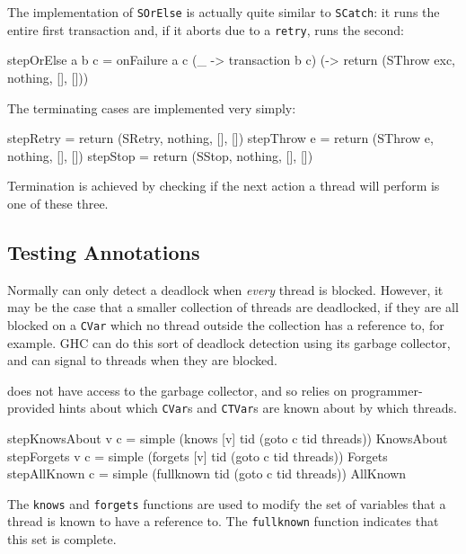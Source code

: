 The implementation of \verb|SOrElse| is actually quite similar to
\verb|SCatch|: it runs the entire first transaction and, if it aborts
due to a \verb|retry|, runs the second:

\begin{haskellcode}
stepOrElse a b c = onFailure a c
  (\_   -> transaction b c)
  (\exc -> return (SThrow exc, nothing, [], []))
\end{haskellcode}

The terminating cases are implemented very simply:

\begin{haskellcode}
stepRetry   = return (SRetry,   nothing, [], [])
stepThrow e = return (SThrow e, nothing, [], [])
stepStop    = return (SStop,    nothing, [], [])
\end{haskellcode}

Termination is achieved by checking if the next action a thread will
perform is one of these three.

\subsection{Testing Annotations}
\label{sec:execution-stepwise-annotations}


Normally \dejafu{} can only detect a deadlock when \emph{every} thread
is blocked. However, it may be the case that a smaller collection of
threads are deadlocked, if they are all blocked on a \verb|CVar| which
no thread outside the collection has a reference to, for example. GHC
can do this sort of deadlock detection using its garbage collector,
and can signal to threads when they are blocked.

\dejafu{} does not have access to the garbage collector, and so relies
on programmer-provided hints about which \verb|CVar|s and
\verb|CTVar|s are known about by which threads.

\begin{haskellcode}
stepKnowsAbout v c = simple (knows   [v] tid (goto c tid threads)) KnowsAbout
stepForgets    v c = simple (forgets [v] tid (goto c tid threads)) Forgets
stepAllKnown     c = simple (fullknown   tid (goto c tid threads)) AllKnown
\end{haskellcode}

The \verb|knows| and \verb|forgets| functions are used to modify the
set of variables that a thread is known to have a reference to. The
\verb|fullknown| function indicates that this set is complete.


